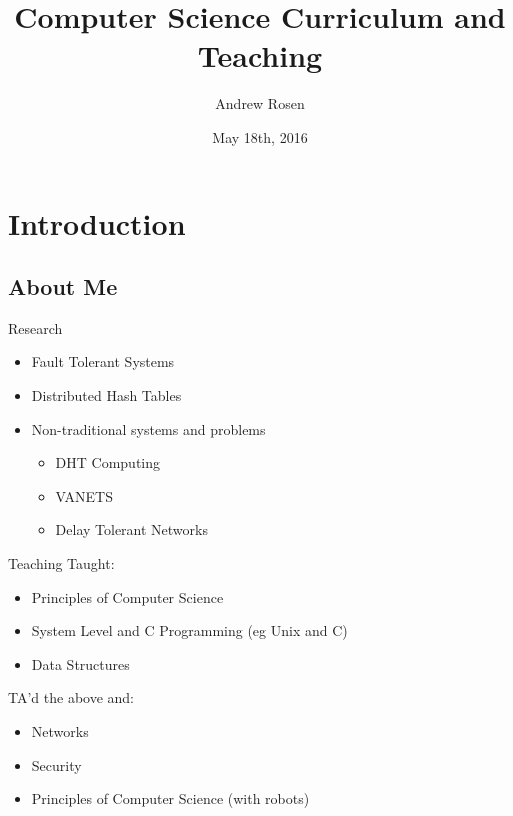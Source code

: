 \documentclass[11pt]{beamer}
\author{Andrew Rosen}
\title[Teaching Experiences]{Computer Science Curriculum and Teaching}
\date{May 18th, 2016}
\begin{document}
	
	
	
\maketitle


\section{Introduction}

\subsection{About Me}

\begin{frame}{Research}
	\begin{itemize}
		\item Fault Tolerant Systems
		\item Distributed Hash Tables
		\item  Non-traditional systems and problems 
		\begin{itemize}
			\item DHT Computing 
			\item VANETS
			\item Delay Tolerant Networks
		\end{itemize}
	\end{itemize}
\end{frame}


\begin{frame}{Teaching}
	Taught:
	\begin{itemize}
		\item Principles of Computer Science
		\item System Level and C Programming (eg Unix and C)
		\item Data Structures
	\end{itemize}
	
	TA'd the above and:
	\begin{itemize}
		\item Networks
		\item Security
		\item Principles of Computer Science (with robots)
	\end{itemize}
\end{frame}
\end{document}
